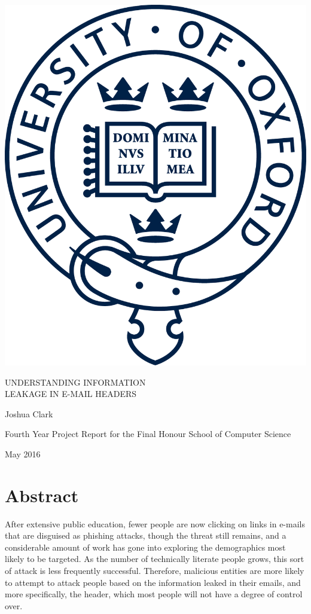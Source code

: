 \documentclass[a4paper,DIV=12,BCOR=7mm,abstract=yes,twoside,11pt]{scrreprt}
\author{Joshua Clark}
\begin{document}
\thispagestyle{empty}

\begin{center} \begin{minipage}[c]{0.75\linewidth} \centering %
\includegraphics[width=0.4\linewidth]{oxford}

\vspace{2cm} %
{\uppercase{\Large{}Understanding Information\\Leakage in E-Mail Headers}{\Large \par}} \vspace{2cm}
{\Large{}Joshua Clark}{\Large \par}

\vspace{2cm} %
{\Large{}Fourth Year Project Report for the Final Honour School of
Computer Science}{\Large \par}

\vspace{2cm} %
{\Large{}May 2016} %
\end{minipage} \par\end{center}

\cleardoublepage 
\chapter*{Abstract}

After extensive public education, fewer people are now clicking on links in
e-mails that are disguised as phishing attacks, though the threat still
remains, and a considerable amount of work has gone into exploring the
demographics most likely to be targeted.  As the number of technically literate
people grows, this sort of attack is less frequently successful.
Therefore, malicious entities are more likely to attempt to attack people based
on the information leaked in their emails, and more specifically, the header,
which most people will not have a degree of control over.
\end{document}
